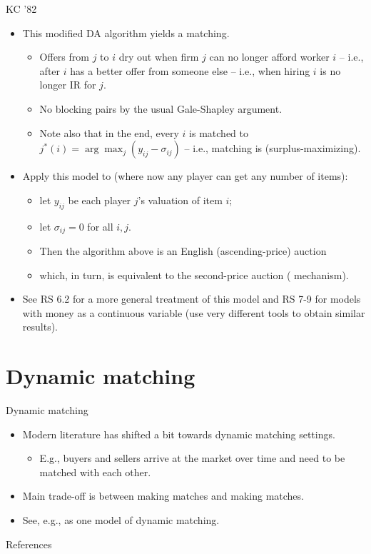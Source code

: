\documentclass[english,10pt
,aspectratio=169
]{beamer}
\begin{document}
\begin{frame}{KC '82}
\begin{itemize}
	\item This modified DA algorithm yields a  matching.
	\begin{itemize}
		\item Offers from $j$ to $i$ dry out when firm $j$ can no longer afford worker $i$ -- i.e., after $i$ has a better offer from someone else -- i.e., when hiring $i$ is no longer IR for $j$.
		\item No blocking pairs by the usual Gale-Shapley argument.
		\item Note also that in the end, every $i$ is matched to $j^*(i) = \arg \max_j (y_{ij}-\sigma_{ij})$ -- i.e., matching is  (surplus-maximizing).
	\end{itemize}
	\pause
	\item Apply this model to  (where now any player can get any number of items): 
	\begin{itemize}
		\item let $y_{ij}$ be each player $j$'s valuation of item $i$;
		\item let $\sigma_{ij} = 0$ for all $i,j$.
		\item Then the algorithm above is an English (ascending-price) auction
		\item which, in turn, is equivalent to the second-price auction ( mechanism).
	\end{itemize}
	\item See RS 6.2 for a more general treatment of this model and RS 7-9 for models with money as a continuous variable (use very different tools to obtain similar results).
\end{itemize}
\end{frame}


\section{Dynamic matching}

\begin{frame}{Dynamic matching}
	\begin{itemize}
		\item Modern literature has shifted a bit towards dynamic matching settings.
		\begin{itemize}
			\item E.g., buyers and sellers arrive at the market over time and need to be matched with each other.
		\end{itemize}
		\item Main trade-off is between making  matches and making  matches.
		\item See, e.g., \citet*{baccara_optimal_2020} as one model of dynamic matching.
	\end{itemize}
\end{frame}

\appendix
\begin{frame}[allowframebreaks]{References}
	
	
\end{frame}
\end{document}
